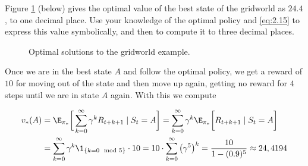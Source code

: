 \begin{exercise}
Figure \ref{fig:2.21} (below) gives the optimal value of the best state of the gridworld as $24.4$, to one decimal place.
Use your knowledge of the optimal policy and \eqref{eq:2.15} to express this value symbolically, and then to compute it to three decimal places.

\begin{figure}[H]
    \centering
    \hspace{1cm}
    \hspace{1cm}
    \hspace{0mm}
    \caption
    {
        Optimal solutions to the gridworld example.
    }
    \label{fig:2.21}
    \end{figure}
\end{exercise}

\begin{solution}
  Once we are in the best state $A$ and follow the optimal policy, we get a reward of $10$ for moving out of the state and then move up again, getting no reward for $4$ steps until we are in state $A$ again. With this we compute

  \begin{align*}
    v_*(A)
    &=
    \E_{\pi_*}\bigg[\sum_{k=0}^\infty \gamma^k R_{t+k+1}\mid S_t = A\bigg]
    =
    \sum_{k=0}^\infty \gamma^k \E_{\pi_*}\bigg[R_{t+k+1}\mid S_t = A\bigg] \\
    &=
    \sum_{k=0}^\infty \gamma^k \1_{\{k = 0 \mod 5\}} \cdot 10
    =
    10 \cdot \sum_{k=0}^\infty \big(\gamma^5\big)^k
    =
    \frac{10}{1-(0.9)^5}
    \approx
    24,4194
  \end{align*}
\end{solution}
